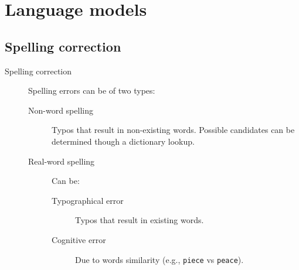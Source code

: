 \chapter{Language models}


\section{Spelling correction}

\begin{description}
    \item[Spelling correction] 
        Spelling errors can be of two types:
        \begin{description}
            \item[Non-word spelling] 
                Typos that result in non-existing words. Possible candidates can be determined though a dictionary lookup.
        
            \item[Real-word spelling] 
                Can be:
                \begin{description}
                    \item[Typographical error] Typos that result in existing words.
                    \item[Cognitive error] Due to words similarity (e.g., \texttt{piece} vs \texttt{peace}).
                \end{description}
        \end{description}
\end{description}



